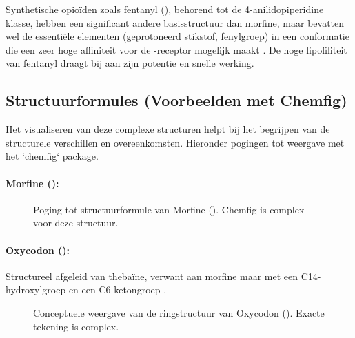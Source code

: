 \documentclass[11pt, a4paper]{report} %
\begin{document}
Synthetische opioïden zoals fentanyl (), behorend tot de 4-anilidopiperidine klasse, hebben een significant andere basisstructuur dan morfine, maar bevatten wel de essentiële elementen (geprotoneerd stikstof, fenylgroep) in een conformatie die een zeer hoge affiniteit voor de \textmu-receptor mogelijk maakt \parencite{PubChemfentanyl}. De hoge lipofiliteit van fentanyl draagt bij aan zijn potentie en snelle werking.

\subsection{Structuurformules (Voorbeelden met Chemfig)}
Het visualiseren van deze complexe structuren helpt bij het begrijpen van de structurele verschillen en overeenkomsten. Hieronder pogingen tot weergave met het `chemfig` package.

\paragraph{Morfine ():}
\begin{figure}[htbp]
    \centering
    \caption{Poging tot structuurformule van Morfine (). Chemfig is complex voor deze structuur.}
    \label{fig:morfine}
\end{figure}

\paragraph{Oxycodon ():} Structureel afgeleid van thebaïne, verwant aan morfine maar met een C14-hydroxylgroep en een C6-ketongroep \parencite{PubChemOxycodone}.
\begin{figure}[htbp]
    \centering
    \caption{Conceptuele weergave van de ringstructuur van Oxycodon (). Exacte tekening is complex.}
    \label{fig:oxycodon} %
\end{figure}
\end{document}
